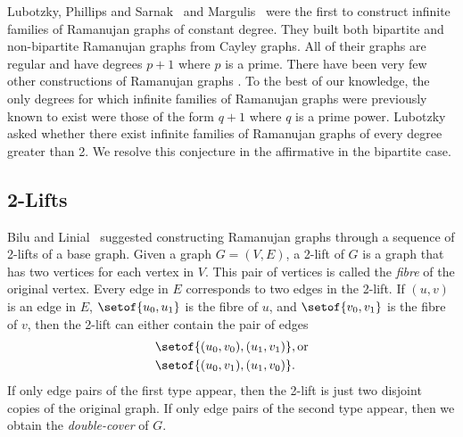 \documentclass[11pt]{article}
\begin{document}

Lubotzky, Phillips and Sarnak~\cite{LPS} and Margulis~\cite{Margulis}
  were the first to construct 
  infinite families of
  Ramanujan graphs of constant degree.
They built both bipartite and non-bipartite Ramanujan graphs from Cayley graphs.
All of their graphs are regular and have degrees $p+1$ where $p$ is a prime.
There have been very few other constructions of Ramanujan graphs
  \cite{pizer,chiu1992cubic,jordan1997ramanujan,Morgenstern}.
To the best of our knowledge, the only degrees for which infinite families of Ramanujan
  graphs were previously known to exist were those of the form $q+1$ where $q$ is a 
  prime power.
Lubotzky~\cite[Problem 10.7.3]{LubotzkyBook} asked whether there exist infinite
  families of Ramanujan graphs of every degree greater than 2.
We resolve this conjecture in the affirmative in the bipartite case.

\subsection{2-Lifts}\label{intro:lifts}

Bilu and Linial~\cite{BiluLinial} suggested constructing Ramanujan graphs through
  a sequence of 2-lifts of a base graph.
Given a graph $G = (V,E)$, a 2-lift of $G$ is a graph that has two vertices
  for each vertex in $V$.
This pair of vertices is called the \textit{fibre} of the original vertex.
Every edge in $E$ corresponds to two edges in the 2-lift.
If $(u,v)$ is an edge in $E$, $\setof{u_{0}, u_{1}}$ is the fibre of $u$,
  and $\setof{v_{0}, v_{1}}$ is the fibre of $v$, then the 2-lift can
  either contain the pair of edges
\begin{align}
&  \setof{(u_{0}, v_{0}), (u_{1}, v_{1})}, \text{or} \label{posedge}\\
&  \setof{(u_{0}, v_{1}), (u_{1}, v_{0})}. \label{negedge}
\end{align}
If only edge pairs of the first type appear, then the 2-lift is just
  two disjoint copies of the original graph.
If only edge pairs of the second type appear, then we obtain the {\em double-cover} of $G$.
\end{document}
